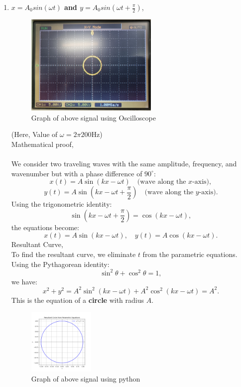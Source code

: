 \begin{enumerate}
\item   \textbf{\large \textbf{$x = A_0 sin(\omega t)$} and \textbf{$y = A_0 sin(\omega t + \frac{\pi}{2})$}},
    \begin{figure}[h!]
    \centering
    \includegraphics[width=0.6\textwidth]{actualgraph/circle.jpg}
    
    \caption{Graph of above signal using  Oscilloscope}
    \label{fig:sample_image}
    \end{figure}
(Here, Value of $\omega=2\pi 200$Hz)\\
Mathematical proof,\\
  \\ We consider two traveling waves with the same amplitude, frequency, and wavenumber but with a phase difference of \(90^\circ\):
\[
x(t) = A \sin(kx - \omega t) \quad \text{(wave along the \(x\)-axis)},
\]
\[
y(t) = A \sin\left(kx - \omega t + \frac{\pi}{2}\right) \quad \text{(wave along the \(y\)-axis)}.
\]
Using the trigonometric identity:
\[
\sin\left(kx - \omega t + \frac{\pi}{2}\right) = \cos(kx - \omega t),
\]
the equations become:
\[
x(t) = A \sin(kx - \omega t), \quad y(t) = A \cos(kx - \omega t).
\]
Resultant Curve,\\
To find the resultant curve, we eliminate \(t\) from the parametric equations. Using the Pythagorean identity:
\[
\sin^2\theta + \cos^2\theta = 1,
\]
we have:
\[
x^2 + y^2 = A^2 \sin^2(kx - \omega t) + A^2 \cos^2(kx - \omega t) = A^2.
\]
This is the equation of a \textbf{circle} with radius \(A\).

\begin{figure}[h!]
    \centering
    \includegraphics[width=0.3\textwidth]{graphs/1.png}
    \caption{Graph of above signal using python}
    \label{fig:sample_image}
     \end{figure}




\end{enumerate}
